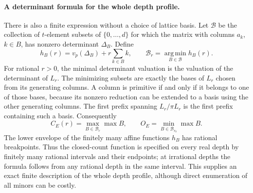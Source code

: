 \paragraph{A determinant formula for the whole depth profile.}
There is also a finite expression without a choice of lattice basis.
Let $\mathcal B$ be the collection of $t$-element subsets of
$\{0,\ldots,d\}$ for which the matrix with columns $a_k$, $k\in B$,
has nonzero determinant $\Delta_B$. Define
\[
 h_B(r)=v_p(\Delta_B)+r\sum_{k\in B}k,
 \qquad \mathcal B_r=\operatorname*{arg\,min}_{B\in\mathcal B}h_B(r).
\]
For rational $r>0$, the minimal determinant valuation is the valuation
of the determinant of $L_r$. The minimizing subsets are exactly the
bases of $L_r$ chosen from its generating columns. A column is primitive
if and only if it belongs to one of those bases, because its nonzero
reduction can be extended to a basis using the other generating columns.
The first prefix spanning $L_r/\pi L_r$ is the first prefix containing
such a basis. Consequently
\[
 C_E(r)=\max_{B\in\mathcal B_r}\max B,
 \qquad O_E=\min_{B\in\mathcal B_{r_0}}\max B.
\]
The lower envelope of the finitely many affine functions $h_B$ has
rational breakpoints. Thus the closed-count function is specified on
every real depth by finitely many rational intervals and their endpoints;
at irrational depths the formula follows from any rational depth in the
same interval. This supplies an exact finite description of the whole
depth profile, although direct enumeration of all minors can be costly.


